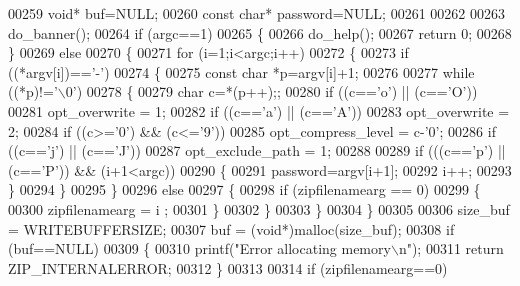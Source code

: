 \begin{DoxyCode}
{{{00259     \textcolor{keywordtype}{void}* buf=NULL;
00260     \textcolor{keyword}{const} \textcolor{keywordtype}{char}* password=NULL;
00261 
00262 
00263     do\_banner();
00264     \textcolor{keywordflow}{if} (argc==1)
00265     \{
00266         do\_help();
00267         \textcolor{keywordflow}{return} 0;
00268     \}
00269     \textcolor{keywordflow}{else}
00270     \{
00271         \textcolor{keywordflow}{for} (i=1;i<argc;i++)
00272         \{
00273             \textcolor{keywordflow}{if} ((*argv[i])==\textcolor{charliteral}{'-'})
00274             \{
00275                 \textcolor{keyword}{const} \textcolor{keywordtype}{char} *p=argv[i]+1;
00276 
00277                 \textcolor{keywordflow}{while} ((*p)!=\textcolor{charliteral}{'\(\backslash\)0'})
00278                 \{
00279                     \textcolor{keywordtype}{char} c=*(p++);;
00280                     \textcolor{keywordflow}{if} ((c==\textcolor{charliteral}{'o'}) || (c==\textcolor{charliteral}{'O'}))
00281                         opt\_overwrite = 1;
00282                     \textcolor{keywordflow}{if} ((c==\textcolor{charliteral}{'a'}) || (c==\textcolor{charliteral}{'A'}))
00283                         opt\_overwrite = 2;
00284                     \textcolor{keywordflow}{if} ((c>=\textcolor{charliteral}{'0'}) && (c<=\textcolor{charliteral}{'9'}))
00285                         opt\_compress\_level = c-\textcolor{charliteral}{'0'};
00286                     \textcolor{keywordflow}{if} ((c==\textcolor{charliteral}{'j'}) || (c==\textcolor{charliteral}{'J'}))
00287                         opt\_exclude\_path = 1;
00288 
00289                     \textcolor{keywordflow}{if} (((c==\textcolor{charliteral}{'p'}) || (c==\textcolor{charliteral}{'P'})) && (i+1<argc))
00290                     \{
00291                         password=argv[i+1];
00292                         i++;
00293                     \}
00294                 \}
00295             \}
00296             \textcolor{keywordflow}{else}
00297             \{
00298                 \textcolor{keywordflow}{if} (zipfilenamearg == 0)
00299                 \{
00300                     zipfilenamearg = i ;
00301                 \}
00302             \}
00303         \}
00304     \}
00305 
00306     size\_buf = WRITEBUFFERSIZE;
00307     buf = (\textcolor{keywordtype}{void}*)malloc(size\_buf);
00308     \textcolor{keywordflow}{if} (buf==NULL)
00309     \{
00310         printf(\textcolor{stringliteral}{"Error allocating memory\(\backslash\)n"});
00311         \textcolor{keywordflow}{return} ZIP\_INTERNALERROR;
00312     \}
00313 
00314     \textcolor{keywordflow}{if} (zipfilenamearg==0)
}}}
\end{DoxyCode}
